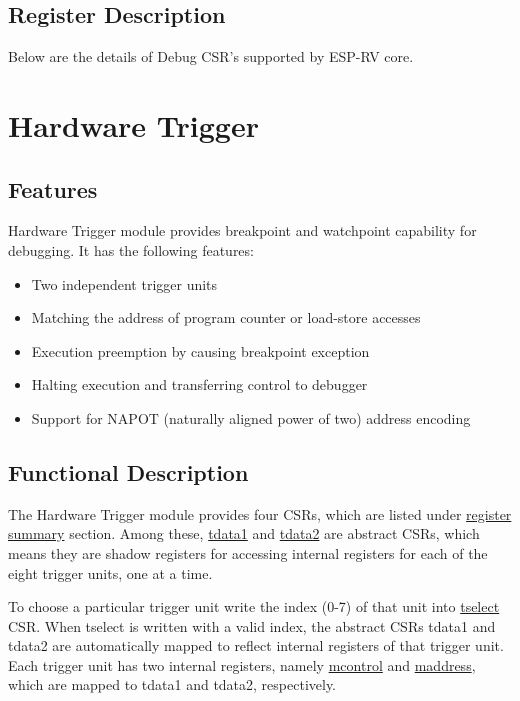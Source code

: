 \documentclass[main\_\_EN.tex]{subfiles}
\begin{document}
\subsection{Register Description}
Below are the details of Debug CSR's supported by ESP-RV core.




\clearpage
\section{Hardware Trigger}
\label{sec:riscvcpu-hwt}


\subsection{Features}
\label{sec:riscvcpu-hwt-features}

Hardware Trigger module provides breakpoint and watchpoint capability for debugging. It has the following features:

\begin{itemize}
    \item Two independent trigger units
    \item Matching the address of program counter or load-store accesses
    \item Execution preemption by causing breakpoint exception
    \item Halting execution and transferring control to debugger
    \item Support for NAPOT (naturally aligned power of two) address encoding
\end{itemize}

\subsection{Functional Description}
\label{sec:riscvcpu-hwt-func-descr}

The Hardware Trigger module provides four CSRs, which are listed under \hyperref[sec:riscvcpu-hwt-reg-summ]{register summary} section. Among these, \hyperref[regdesc:TDATA1]{tdata1} and \hyperref[regdesc:TDATA2]{tdata2} are abstract CSRs, which means they are shadow registers for accessing internal registers for each of the eight trigger units, one at a time.

To choose a particular trigger unit write the index (0-7) of that unit into \hyperref[regdesc:TSELECT]{tselect} CSR. When tselect is written with a valid index, the abstract CSRs tdata1 and tdata2 are automatically mapped to reflect internal registers of that trigger unit. Each trigger unit has two internal registers, namely \hyperref[regdesc:MCONTROL]{mcontrol} and \hyperref[regdesc:MADDRESS]{maddress}, which are mapped to tdata1 and tdata2, respectively.
\end{document}
